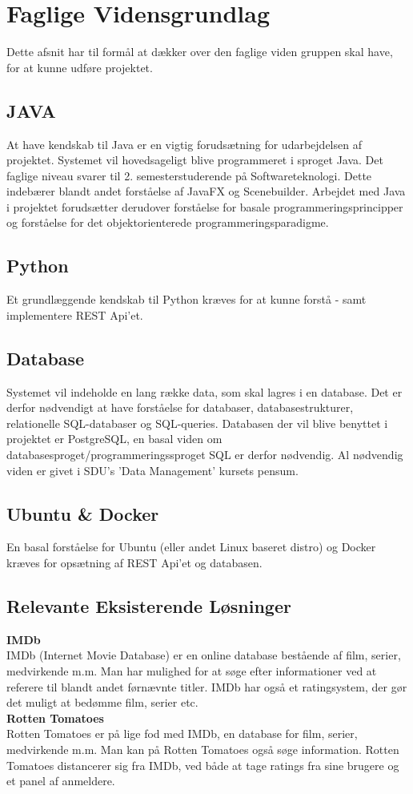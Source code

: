 \section{Faglige Vidensgrundlag}
Dette afsnit har til formål at dækker over den faglige viden gruppen skal have, for at kunne udføre projektet.

\subsection{JAVA}
At have kendskab til Java er en vigtig forudsætning for udarbejdelsen af projektet. Systemet vil hovedsageligt blive programmeret i sproget Java. Det faglige niveau svarer til 2. semesterstuderende på Softwareteknologi. Dette indebærer blandt andet forståelse af JavaFX og Scenebuilder.
Arbejdet med Java i projektet forudsætter derudover forståelse for basale programmeringsprincipper og forståelse for det objektorienterede programmeringsparadigme. 

\subsection{Python}
Et grundlæggende kendskab til Python kræves for at kunne forstå - samt implementere REST Api'et.

\subsection{Database}
Systemet vil indeholde en lang række data, som skal lagres i en database. Det er derfor nødvendigt at have forståelse for databaser, databasestrukturer, relationelle SQL-databaser og SQL-queries. Databasen der vil blive benyttet i projektet er PostgreSQL, en basal viden om databasesproget/programmeringssproget SQL er derfor nødvendig. 
Al nødvendig viden er givet i SDU's 'Data Management' kursets pensum.

\subsection{Ubuntu \& Docker}
En basal forståelse for Ubuntu (eller andet Linux baseret distro) og Docker kræves for opsætning af REST Api'et og databasen.

\subsection{Relevante Eksisterende Løsninger}
\textbf{IMDb} \\
IMDb (Internet Movie Database) er en online database bestående af film, serier, medvirkende m.m. Man har mulighed for at søge efter informationer ved at referere til blandt andet førnævnte titler. IMDb har også et ratingsystem, der gør det muligt at bedømme film, serier etc.\\
\textbf{Rotten Tomatoes} \\
Rotten Tomatoes er på lige fod med IMDb, en database for film, serier, medvirkende m.m. Man kan på Rotten Tomatoes også søge information. Rotten Tomatoes distancerer sig fra IMDb, ved både at tage ratings fra sine brugere og et panel af anmeldere. 